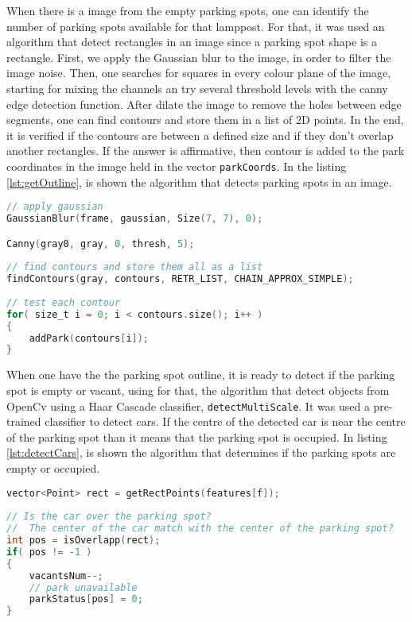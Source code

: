 When there is a image from the empty parking spots, one can identify the number of parking spots available for that lamppost. For that, it was used an algorithm that detect rectangles in an image since a parking spot shape is a rectangle. First, we apply the Gaussian blur to the image, in order to filter the image noise. Then, one searches for squares in every colour plane of the image, starting for mixing the channels an try several threshold levels with the canny edge detection function. After dilate the image to remove the holes between edge segments, one can find contours and store them in a list of 2D points. In the end, it is verified if the contours are between a defined size and if they don't overlap another rectangles. If the answer is affirmative, then contour is added to the park coordinates in the image held in the vector \verb|parkCoords|. In the listing \ref{lst:getOutline}, is shown the algorithm that detects parking spots in an image.

\begin{lstlisting}[language=C, caption={Parking Spots Detection.}, label={lst:getOutline}]
// apply gaussian
GaussianBlur(frame, gaussian, Size(7, 7), 0);

Canny(gray0, gray, 0, thresh, 5);
		
// find contours and store them all as a list
findContours(gray, contours, RETR_LIST, CHAIN_APPROX_SIMPLE);
	
// test each contour
for( size_t i = 0; i < contours.size(); i++ )
{
	addPark(contours[i]);
}
\end{lstlisting}

When one have the the parking spot outline, it is ready to detect if the parking spot is empty or vacant, using for that, the algorithm that detect objects from OpenCv using a Haar Cascade classifier, \verb|detectMultiScale|. It was used a pre-trained classifier to detect cars. If the centre of the detected car is near the centre of the parking spot than it means that the parking spot is occupied. In listing \ref{lst:detectCars}, is shown the algorithm that determines if the parking spots are empty or occupied. 

\begin{lstlisting}[language=C, caption={Empty Parking Spots Detection.}, label={lst:detectCars}]
vector<Point> rect = getRectPoints(features[f]);
	
// Is the car over the parking spot?
//  The center of the car match with the center of the parking spot?
int pos = isOverlapp(rect);
if( pos != -1 )
{
	vacantsNum--;
	// park unavailable
	parkStatus[pos] = 0;
}
\end{lstlisting}

